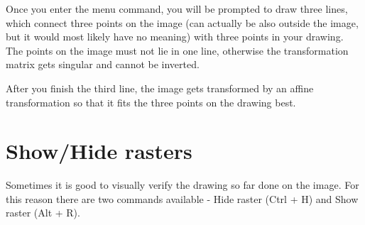 Once you enter the menu command, you will be prompted to draw three lines, which connect
three points on the image (can actually be also outside the image, but it would most
likely have no meaning) with three points in your drawing. The points on the image
must not lie in one line, otherwise the transformation matrix gets singular and cannot
be inverted.

After you finish the third line, the image gets transformed by an affine transformation
so that it fits the three points on the drawing best.

\section{Show/Hide rasters}\label{sec:showraster}

Sometimes it is good to visually verify the drawing so far done on the image. For this
reason there are two commands available - Hide raster (Ctrl + H) and Show raster (Alt + R).

